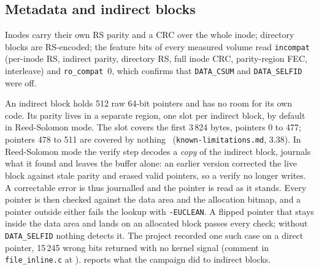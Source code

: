 \subsection{Metadata and indirect blocks}\label{sec:indirect-design}

Inodes carry their own RS parity and a CRC over the whole inode;
directory blocks are RS-encoded; the feature bits of every measured
volume read \texttt{incompat}~\featIncompat{} (per-inode RS, indirect
parity, directory RS, full inode CRC, parity-region FEC, interleave) and
\texttt{ro\_compat}~0, which confirms that \texttt{DATA\_CSUM} and
\texttt{DATA\_SELFID} were off.

An indirect block holds 512 raw 64-bit pointers and has no room for its
own code. Its parity lives in a separate region, one slot per indirect
block, by default in Reed-Solomon mode. The slot covers the first 3\,824
bytes, pointers 0 to 477; pointers 478 to 511 are covered by
nothing~\cite{beamfsimpl} (\texttt{known-limitations.md}, 3.38). In
Reed-Solomon mode the verify step decodes a \emph{copy} of the indirect
block, journals what it found and leaves the buffer alone: an earlier
version corrected the live block against stale parity and erased valid
pointers, so a verify no longer writes. A correctable error is thus
journalled and the pointer is read as it stands. Every pointer is then
checked against the data area and the allocation bitmap, and a pointer
outside either fails the lookup with \texttt{-EUCLEAN}. A flipped pointer
that stays inside the data area and lands on an allocated block passes
every check; without \texttt{DATA\_SELFID} nothing detects it. The
project recorded one such case on a direct pointer, 15\,245 wrong bits
returned with no kernel signal (comment in \texttt{file\_inline.c} at
\texttt{\commitBeamfs}).  reports what the campaign
did to indirect blocks.
